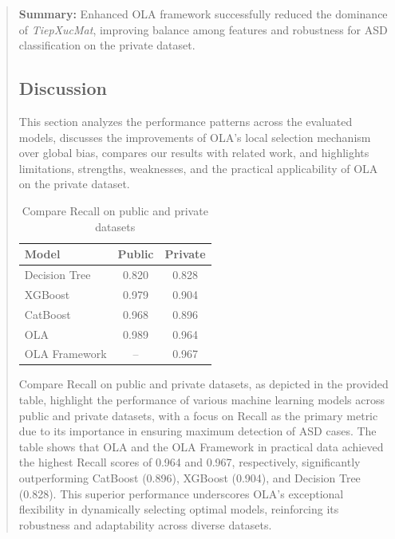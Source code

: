 \documentclass[runningheads]{llncs}
\begin{document}
\begin{abstract}
\noindent\textbf{Summary:} Enhanced OLA framework successfully reduced the dominance of \textit{TiepXucMat}, improving balance among features and robustness for ASD classification on the private dataset.

\subsection{Discussion}
This section analyzes the performance patterns across the evaluated models, discusses the improvements of OLA's local selection mechanism over global bias, compares our results with related work, and highlights limitations, strengths, weaknesses, and the practical applicability of OLA on the private dataset.

\begin{table}[ht]
\caption{Compare Recall on public and private datasets}
\label{tab:recall_public_private}
\centering
\small                 %
\setlength{\tabcolsep}{6pt} %
\renewcommand{\arraystretch}{1.1} %
\begin{tabular}{|l|c|c|}
\hline
\textbf{Model} & \textbf{Public} & \textbf{Private} \\
\hline
Decision Tree & 0.820 & 0.828 \\
XGBoost       & 0.979 & 0.904 \\
CatBoost      & 0.968 & 0.896 \\
OLA           & 0.989 & 0.964 \\
OLA Framework & -- & 0.967 \\
\hline
\end{tabular}
\end{table}


Compare Recall on public and private datasets, as depicted in the provided table, highlight the performance of various machine learning models across public and private datasets, with a focus on Recall as the primary metric due to its importance in ensuring maximum detection of ASD cases. The table shows that OLA and the OLA Framework in practical data achieved the highest Recall scores of 0.964 and 0.967, respectively, significantly outperforming CatBoost (0.896), XGBoost (0.904), and Decision Tree (0.828). This superior performance underscores OLA's exceptional flexibility in dynamically selecting optimal models, reinforcing its robustness and adaptability across diverse datasets.


\end{abstract}
\end{document}
